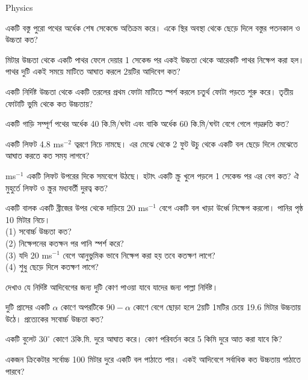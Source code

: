 \documentclass[addpoints]{exam}
\begin{document}
\begin{LARGE}
\begin{center}
Physics
\end{center}
\end{LARGE}
\begin{questions}

\question  একটি বস্তু পুরো পথের অর্ধেক শেষ সেকেন্ডে অতিক্রম করে। একে স্থির অবস্থা থেকে ছেড়ে দিলে বস্তুর পতনকাল ও উচ্চতা কত?

 মিটার উচ্চতা থেকে একটি পাথর ফেলে দেয়ার 1 সেকেন্ড পর একই উচ্চতা থেকে আরেকটি পাথর নিক্ষেপ করা হল। পাথর দুটি একই সময়ে মাটিতে আঘাত করলে 2য়টির আদিবেগ কত? 

\question একটি নির্দিষ্ট উচ্চতা থেকে একটি তরলের প্রথম ফোটা মাটিতে স্পর্শ করলে চতুর্থ ফোটা পড়তে শুরু করে। তৃতীয় ফোটাটি ভুমি থেকে কত উচ্চতায়?

\question একটি গাড়ি সম্পূর্ণ পথের অর্ধেক 40 কি.মি/ঘন্টা এবং বাকি অর্ধেক 60 কি.মি/ঘন্টা বেগে গেলে গড়দ্রুতি কত?

\question একটি লিফট 4.8 ms$ ^{-2} $ ত্বরণে  নিচে নামছে। এর মেঝে থেকে 2 ফুট উচু থেকে একটি বল ছেড়ে দিলে মেঝেতে আঘাত করতে কত সময় লাগবে?

 ms$ ^{-1} $ একটি লিফট উপরের দিকে সমবেগে উঠছে। হটাৎ একটি স্ক্রু খুলে পড়লে 1 সেকেন্ড পর এর বেগ কত? ঐ মুহুর্তে লিফট ও স্ক্রুর মধ্যবর্তী দুরত্ব কত?

\question একটি বালক একটি ব্রীজের উপর থেকে দাড়িয়ে 20 ms$ ^{-1} $ বেগে একটি বল খাড়া উর্ধ্বে নিক্ষেপ করলো। পানির পৃষ্ঠ 10 মিটার নিচে।\\
(1)	সবোর্চ্চ উচ্চতা কত?\\
(2)	নিক্ষেপনের কতক্ষন পর পানি স্পর্শ করে?\\
(3)	যদি 20 ms$ ^{-1} $ বেগে আনুভুমিক ভাবে নিক্ষেপ করা হয় তবে কতক্ষণ লাগে?\\
(4)	শুধু ছেড়ে দিলে কতক্ষণ লাগে?


\question দেখাও যে নির্দিষ্ট আদিবেগের জন্য দুটি কোণ পাওয়া যাবে যাদের জন্য পাল্লা নির্দিষ্ট।

\question  দুটি প্রাসের একটি $ \alpha $ কোণে অপরটিকে $ 90-\alpha $ কোণে বেগে ছোড়া হলে 2য়টি 1মটির চেয়ে 19.6 মিটার উচ্চতায় উঠে। প্রত্যেকের সবোর্চ্চ উচ্চতা কত? 

\question একটি বুলেট $ 30^{\circ} $ কোণে 3কি.মি. দুরে আঘাত করে। কোণ পরিবর্তন করে 5 কিমি দুরে আত করা যাবে কি? 

\question একজন ক্রিকেটার সর্বোচ্চ 100 মিটার দুরে একটি বল পাঠাতে পার। একই আদিবেগে সর্বাধিক কত উচ্চতায় পাঠাতে পারবে? 




\end{questions}
\end{document}
